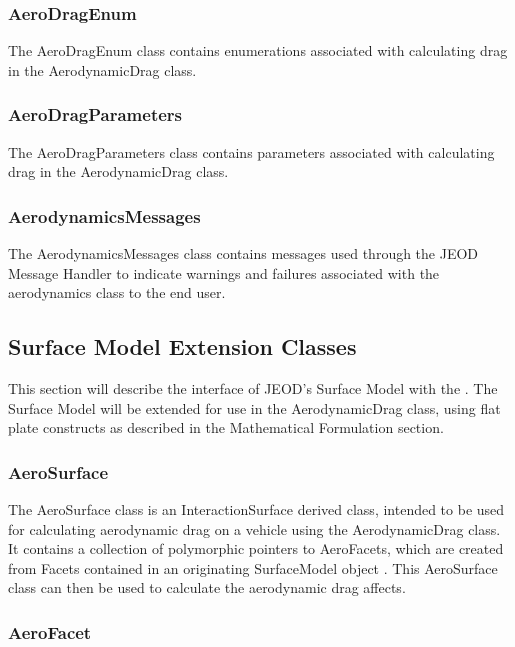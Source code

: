 \subsubsection{AeroDragEnum}

The AeroDragEnum class contains enumerations associated with calculating drag in the
AerodynamicDrag class.

\subsubsection{AeroDragParameters}

The AeroDragParameters class contains parameters associated with calculating drag in the
AerodynamicDrag class.

\subsubsection{AerodynamicsMessages}

The AerodynamicsMessages class contains messages used through the JEOD Message Handler
\cite{dynenv:MESSAGE} to indicate warnings and failures associated with the
aerodynamics class to the end user.

\subsection{Surface Model Extension Classes}

This section will describe the interface of JEOD's Surface
Model \cite{dynenv:SURFACEMODEL} with the \aerodynamicsDesc. The
Surface Model will be extended for use in the
AerodynamicDrag class, using flat plate constructs as described in the
Mathematical Formulation section.

\subsubsection{AeroSurface}

The AeroSurface class is an InteractionSurface \cite{dynenv:SURFACEMODEL} derived class,
intended to be used for calculating aerodynamic drag on a vehicle using the AerodynamicDrag
class. It contains a collection of polymorphic pointers to AeroFacets, which are created
from Facets contained in an originating SurfaceModel object
\cite{dynenv:SURFACEMODEL}. This AeroSurface class can then be used
to calculate the aerodynamic drag affects.

\subsubsection{AeroFacet}

